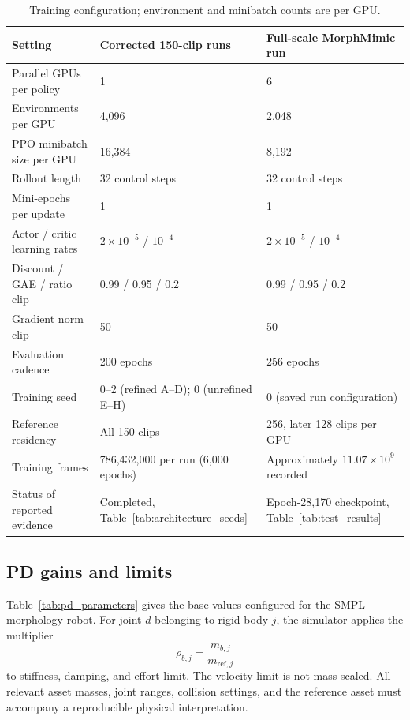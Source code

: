 \begin{table}[!htb]
\centering
\small
\caption{Training configuration; environment and minibatch counts are per GPU.}\label{tab:training_parameters}
\begin{tabularx}{\linewidth}{@{}lYY@{}}
\toprule
Setting & Corrected 150-clip runs & Full-scale MorphMimic run \\
\midrule
Parallel GPUs per policy & 1 & 6 \\
Environments per GPU & 4,096 & 2,048 \\
PPO minibatch size per GPU & 16,384 & 8,192 \\
Rollout length & 32 control steps & 32 control steps \\
Mini-epochs per update & 1 & 1 \\
Actor / critic learning rates &
$2\times10^{-5}$ / $10^{-4}$ & $2\times10^{-5}$ / $10^{-4}$ \\
Discount / GAE / ratio clip & 0.99 / 0.95 / 0.2 & 0.99 / 0.95 / 0.2 \\
Gradient norm clip & 50 & 50 \\
Evaluation cadence & 200 epochs & 256 epochs \\
Training seed & 0--2 (refined A--D); 0 (unrefined E--H) & 0 (saved run configuration) \\
Reference residency & All 150 clips & 256, later 128 clips per GPU \\
Training frames & 786,432,000 per run (6,000 epochs) & Approximately $11.07\times10^9$ recorded \\
Status of reported evidence & Completed, Table~\ref{tab:architecture_seeds} & Epoch-28,170 checkpoint, Table~\ref{tab:test_results} \\
\bottomrule
\end{tabularx}
\end{table}

\subsection{PD gains and limits}\label{app:control}

Table~\ref{tab:pd_parameters} gives the base values configured for the
SMPL morphology robot. For joint $d$ belonging to rigid body $j$, the
simulator applies the multiplier
\begin{equation}
    \rho_{b,j} = \frac{m_{b,j}}{m_{\mathrm{ref},j}}
\end{equation}
to stiffness, damping, and effort limit. The velocity limit is not mass-scaled.
All relevant asset masses, joint ranges, collision settings, and the reference
asset must accompany a reproducible physical interpretation.

